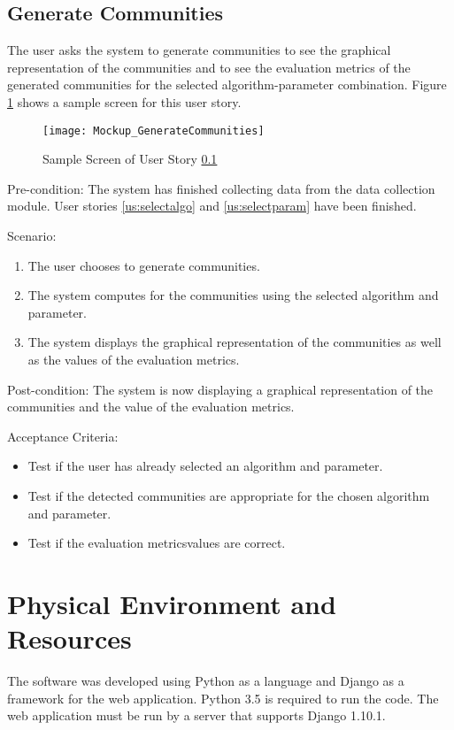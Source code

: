 \subsection{Generate Communities}
\label{us:gencom}


The user asks the system to generate communities to see the graphical representation of the communities and to see the 
evaluation metrics of the generated communities for the selected algorithm-parameter combination. Figure \ref{fig:gencom} shows a sample screen for this user story.

\begin{figure}[h]
	\centering
	\texttt{[image: Mockup\_GenerateCommunities]}
	\caption{Sample Screen of User Story \ref{us:gencom}}
	\label{fig:gencom}	
\end{figure}

Pre-condition: The system has finished collecting data from the data collection module. User stories \ref{us:selectalgo} and \ref{us:selectparam} have been finished.


Scenario:
\begin{enumerate}
	\item The user chooses to generate communities.
	\item The system computes for the communities using the selected algorithm and parameter.
	\item The system displays the graphical representation of the communities as well as the values of the evaluation metrics.
\end{enumerate}


Post-condition: The system is now displaying a graphical representation of the communities and the value of the evaluation
metrics.


Acceptance Criteria:
\begin{itemize}
	\item Test if the user has already selected an algorithm and parameter.
	\item Test if the detected communities are appropriate for the chosen algorithm and parameter.
	\item Test if the evaluation metrics\vtick values are correct.
\end{itemize}


\section{Physical Environment and Resources}
The software was developed using Python as a language and Django as a framework for the web application. Python 3.5 is required to run the code. The web application must be run by a server that supports Django 1.10.1. 




